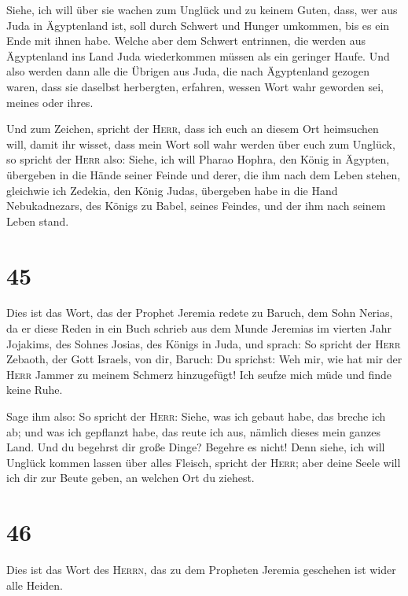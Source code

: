  Siehe, ich will über sie wachen zum Unglück und zu
keinem Guten, dass, wer aus Juda in Ägyptenland ist, soll durch Schwert
und Hunger umkommen, bis es ein Ende mit ihnen habe. 
Welche aber dem Schwert entrinnen, die werden aus Ägyptenland ins Land
Juda wiederkommen müssen als ein geringer Haufe. Und also werden dann
alle die Übrigen aus Juda, die nach Ägyptenland gezogen waren, dass sie
daselbst herbergten, erfahren, wessen Wort wahr geworden sei, meines
oder ihres.

 Und zum Zeichen, spricht der \textsc{Herr}, dass ich
euch an diesem Ort heimsuchen will, damit ihr wisset, dass mein Wort
soll wahr werden über euch zum Unglück,  so spricht der
\textsc{Herr} also: Siehe, ich will Pharao Hophra, den König in Ägypten,
übergeben in die Hände seiner Feinde und derer, die ihm nach dem Leben
stehen, gleichwie ich Zedekia, den König Judas, übergeben habe in die
Hand Nebukadnezars, des Königs zu Babel, seines Feindes, und der ihm
nach seinem Leben stand.

\hypertarget{section-44}{%
\section{45}\label{section-44}}

 Dies ist das Wort, das der Prophet Jeremia redete zu
Baruch, dem Sohn Nerias, da er diese Reden in ein Buch schrieb aus dem
Munde Jeremias im vierten Jahr Jojakims, des Sohnes Josias, des Königs
in Juda, und sprach:  So spricht der \textsc{Herr}
Zebaoth, der Gott Israels, von dir, Baruch:  Du sprichst:
Weh mir, wie hat mir der \textsc{Herr} Jammer zu meinem Schmerz
hinzugefügt! Ich seufze mich müde und finde keine Ruhe.

 Sage ihm also: So spricht der \textsc{Herr}: Siehe, was
ich gebaut habe, das breche ich ab; und was ich gepflanzt habe, das
reute ich aus, nämlich dieses mein ganzes Land.  Und du
begehrst dir große Dinge? Begehre es nicht! Denn siehe, ich will Unglück
kommen lassen über alles Fleisch, spricht der \textsc{Herr}; aber deine
Seele will ich dir zur Beute geben, an welchen Ort du ziehest.

\hypertarget{section-45}{%
\section{46}\label{section-45}}

 Dies ist das Wort des \textsc{Herrn}, das zu dem
Propheten Jeremia geschehen ist wider alle Heiden.

